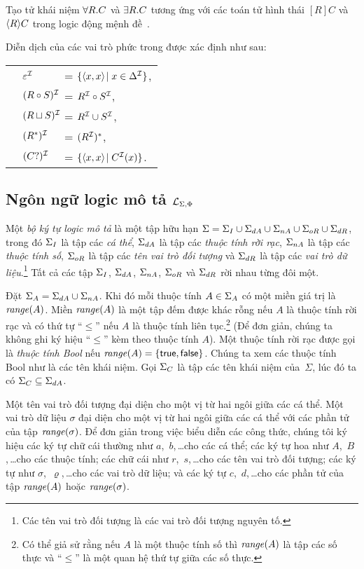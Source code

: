 Tạo tử khái niệm $\forall R.C$ và $\exists R.C$ tương ứng với các toán tử hình thái $[R]C$ và $\left\langle R\right\rangle\!C$ trong logic động mệnh đề~\cite{Nguyen2013}.

Diễn dịch của các vai trò phức trong \ALCreg được xác định như sau:\\[1.0ex]
\begin{tabular}{c l l}
	& $\varepsilon^{\mathcal{I}}$ & =\; $\{\left\langle x,x\right\rangle\! \mid x \in \Delta^{\mathcal{I}}\}$,\\[0.5ex]
	& $(R \circ S)^{\mathcal{I}}\!\!\!\!\!$ & =\; $R^{\mathcal{I}} \circ S^{\mathcal{I}}$, \\[0.5ex]
	& $(R \sqcup S)^{\mathcal{I}}\!\!\!\!\!$ & =\; $R^{\mathcal{I}} \cup S^{\mathcal{I}}$, \\[0.5ex]
	& $(R^*)^{\mathcal{I}}$       & =\; $(R^{\mathcal{I}})^*$, \\[0.5ex]
	& $(C?)^{\mathcal{I}}$        & =\; $\{\left\langle x,x\right\rangle\! \mid C^{\mathcal{I}}(x)\}$.
\end{tabular}


\subsection{Ngôn ngữ logic mô tả $\mathcal{L}_{\Sigma,\Phi}$}
\label{sec:Chap1.LSPLanguage}

Một {\em bộ ký tự logic mô tả} là một tập hữu hạn $\Sigma = \Sigma_I \cup \Sigma_{dA} \cup \Sigma_{nA} \cup \Sigma_{oR} \cup \Sigma_{dR}$, trong đó $\Sigma_I$ là tập các {\em cá thể}, $\Sigma_{dA}$ là tập các {\em thuộc tính rời rạc}, $\Sigma_{nA}$ là tập các {\em thuộc tính số}, $\Sigma_{oR}$ là tập các {\em tên vai trò đối tượng} và $\Sigma_{dR}$ là tập các {\em vai trò dữ liệu}.\footnote{Các tên vai trò đối tượng là các vai trò đối tượng nguyên tố.} Tất cả các tập $\Sigma_I$, $\Sigma_{dA}$, $\Sigma_{nA}$, $\Sigma_{oR}$ và $\Sigma_{dR}$ rời nhau từng đôi một.

Đặt $\Sigma_A = \Sigma_{dA} \cup \Sigma_{nA}$. Khi đó mỗi thuộc tính $A \in \Sigma_A$ có một miền giá trị là $\mathit{range}(A)$. Miền $\mathit{range}(A)$ là một tập đếm được khác rỗng nếu $A$ là thuộc tính rời rạc và có thứ tự ``$\leq$'' nếu $A$ là thuộc tính liên tục.\footnote{Có thể giả sử rằng nếu $A$ là một thuộc tính số thì $\mathit{range}(A)$ là tập các số thực và ``$\leq$'' là một quan hệ thứ tự giữa các số thực.} (Để đơn giản, chúng ta không ghi ký hiệu ``$\leq$'' kèm theo thuộc tính $A$).
%
Một thuộc tính rời rạc được gọi là {\em thuộc tính Bool} nếu $\mathit{range}(A) = \{\mathsf{true},\mathsf{false}\}$. Chúng ta xem các thuộc tính Bool như là các tên khái niệm. Gọi $\Sigma_C$ là tập các tên khái niệm của~$\Sigma$, lúc đó ta có $\Sigma_C \subseteq \Sigma_{dA}$.

Một tên vai trò đối tượng đại diện cho một vị từ hai ngôi giữa các cá thể. Một vai trò dữ liệu $\sigma$ đại diện cho một vị từ hai ngôi giữa các cá thể với các phần tử của tập $\mathit{range}(\sigma)$.
%
Để đơn giản trong việc biểu diễn các công thức, chúng tôi ký hiệu các ký tự chữ cái thường như $a$,~$b$,\,\ldots\;cho các cá thể; các ký tự hoa như $A$,~$B$,\,\ldots\;cho các thuộc tính; các chữ cái như $r$,~$s$,\,\ldots\;cho các tên vai trò đối tượng; các ký tự như $\sigma$,~$\varrho$,\,\ldots\;cho các vai trò dữ liệu; và các ký tự $c$,~$d$,\,\ldots\;cho các phần tử của tập $\mathit{range}(A)$ hoặc $\mathit{range}(\sigma)$.

